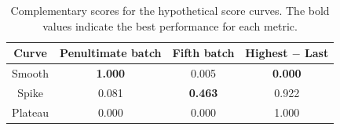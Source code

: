 \begin{table}
    \centering
    \begin{tabular}{|c|c|c|c|}
        \hline
        Curve & Penultimate batch & Fifth batch & Highest $-$ Last \\
        \hline
        Smooth & \textbf{1.000} & 0.005 & \textbf{0.000} \\
        Spike & 0.081 & \textbf{0.463} & 0.922 \\
        Plateau & 0.000 & 0.000 & 1.000 \\
        \hline
    \end{tabular}
    \caption{Complementary scores for the hypothetical score curves. The bold values indicate the best performance for each metric.}
    \label{tab:complementary_scores_on_the_hypotheticals}
\end{table}
